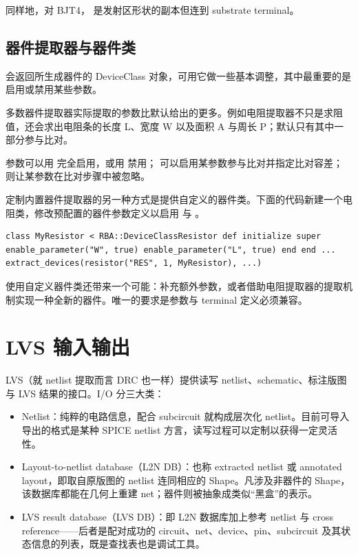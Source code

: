 
同样地，对 BJT4， 是发射区形状的副本但连到 substrate terminal。


\subsection{器件提取器与器件类}

 会返回所生成器件的 DeviceClass 对象，可用它做一些基本调整，其中最重要的是启用或禁用某些参数。

多数器件提取器实际提取的参数比默认给出的更多。例如电阻提取器不只是求阻值，还会求出电阻条的长度 L、宽度 W 以及面积 A 与周长 P；默认只有其中一部分参与比对。

参数可以用  完全启用，或用  禁用； 可以启用某参数参与比对并指定比对容差； 则让某参数在比对步骤中被忽略。

定制内置器件提取器的另一种方式是提供自定义的器件类。下面的代码新建一个电阻类，修改预配置的器件参数定义以启用  与 。

\begin{lstlisting}
class MyResistor < RBA::DeviceClassResistor def initialize super enable_parameter("W", true) enable_parameter("L", true) end end ... extract_devices(resistor("RES", 1, MyResistor), ...)
\end{lstlisting}

使用自定义器件类还带来一个可能：补充额外参数，或者借助电阻提取器的提取机制实现一种全新的器件。唯一的要求是参数与 terminal 定义必须兼容。

\section{LVS 输入输出}\label{sec:lvs_io}

LVS（就 netlist 提取而言 DRC 也一样）提供读写 netlist、schematic、标注版图与 LVS 结果的接口。I/O 分三大类：

\begin{itemize}
\item Netlist：纯粹的电路信息，配合 subcircuit 就构成层次化 netlist。目前可导入导出的格式是某种 SPICE netlist 方言，读写过程可以定制以获得一定灵活性。
\item Layout-to-netlist database（L2N DB）：也称 extracted netlist 或 annotated layout，即取自原版图的 netlist 连同相应的 Shape。凡涉及非器件的 Shape，该数据库都能在几何上重建 net；器件则被抽象成类似“黑盒”的表示。
\item LVS result database（LVS DB）：即 L2N 数据库加上参考 netlist 与 cross reference——后者是配对成功的 circuit、net、device、pin、subcircuit 及其状态信息的列表，既是查找表也是调试工具。
\end{itemize}

